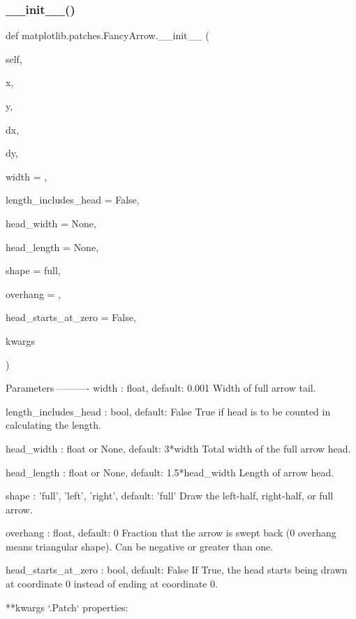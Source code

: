\subsubsection{\texorpdfstring{\+\_\+\+\_\+init\+\_\+\+\_\+()}{\_\_init\_\_()}}
{\footnotesize\ttfamily def matplotlib.\+patches.\+Fancy\+Arrow.\+\_\+\+\_\+init\+\_\+\+\_\+ (\begin{DoxyParamCaption}\item[{}]{self,  }\item[{}]{x,  }\item[{}]{y,  }\item[{}]{dx,  }\item[{}]{dy,  }\item[{}]{width = {},  }\item[{}]{length\+\_\+includes\+\_\+head = {\ttfamily False},  }\item[{}]{head\+\_\+width = {\ttfamily None},  }\item[{}]{head\+\_\+length = {\ttfamily None},  }\item[{}]{shape = {\ttfamily \textquotesingle{}full\textquotesingle{}},  }\item[{}]{overhang = {},  }\item[{}]{head\+\_\+starts\+\_\+at\+\_\+zero = {\ttfamily False},  }\item[{}]{kwargs }\end{DoxyParamCaption})}

\begin{DoxyVerb}Parameters
----------
width : float, default: 0.001
    Width of full arrow tail.

length_includes_head : bool, default: False
    True if head is to be counted in calculating the length.

head_width : float or None, default: 3*width
    Total width of the full arrow head.

head_length : float or None, default: 1.5*head_width
    Length of arrow head.

shape : {'full', 'left', 'right'}, default: 'full'
    Draw the left-half, right-half, or full arrow.

overhang : float, default: 0
    Fraction that the arrow is swept back (0 overhang means
    triangular shape). Can be negative or greater than one.

head_starts_at_zero : bool, default: False
    If True, the head starts being drawn at coordinate 0
    instead of ending at coordinate 0.

**kwargs
    `.Patch` properties:

\end{DoxyVerb}
 

